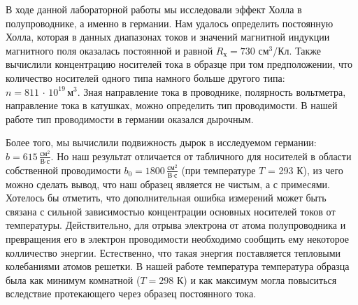 \documentclass[a4paper]{article}
\theoremstyle{definition}
\theoremstyle{remark}
\begin{document}
    В ходе данной лабораторной работы мы исследовали эффект Холла в полупроводнике, а именно в германии. Нам удалось определить постоянную Холла, которая в данных диапазонах токов и значений магнитной индукции магнитного поля оказалась постоянной и равной $R_\text{х} = 730$ см$^3$/Кл. Также вычислили концентрацию носителей тока в образце при том предположении, что количество носителей одного типа намного больше другого типа: $n = 811\, \cdot \, 10^{19}\,\text{м}^3$. Зная направление тока в проводнике, полярность вольтметра, направление тока в катушках, можно определить тип проводимости. В нашей работе тип проводимости в германии оказался дырочным.
	
	Более того, мы вычислили подвижность дырок в исследуемом германии: $b = 615\, \frac{\text{см}^2}{\text{В}\cdot\text{с}}$. Но наш результат отличается от табличного для носителей в области собственной проводимости $b_0 = 1800\, \frac{\text{см}^2}{\text{В}\cdot\text{с}}$ (при температуре $T$ = 293 К), из чего можно сделать вывод, что наш образец является не чистым, а с примесями. Хотелось бы отметить, что дополнительная ошибка измерений может быть связана с сильной зависимостью концентрации основных носителей токов от температуры. Действительно, для отрыва электрона от атома полупроводника и превращения его в электрон проводимости необходимо сообщить ему некоторое колличество энергии. Естественно, что такая энергия поставляется тепловыми колебаниями атомов решетки. В нашей работе температура температура образца была как минимум комнатной ($T = 298$ К) и как максимум могла повыситься вследствие протекающего через образец постоянного тока.
	
\end{document}
